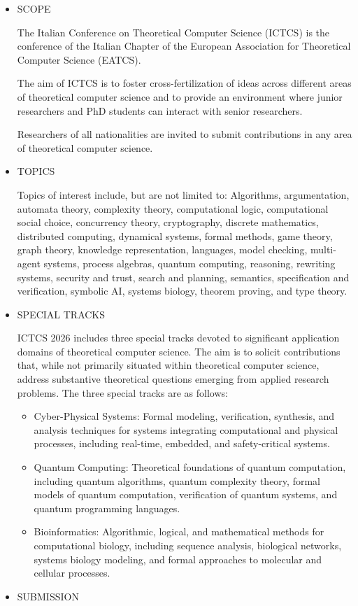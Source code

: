 \documentclass[prodmode,acmtecs]{acmsmall} %
\begin{document}
\begin{itemize}\item  SCOPE 
 
  The Italian Conference on Theoretical Computer Science (ICTCS) is the conference of the Italian Chapter of the European Association for Theoretical Computer Science (EATCS). 
 
  The aim of ICTCS is to foster cross-fertilization of ideas across different areas of theoretical computer science and to provide an environment where junior researchers and PhD students can interact with senior researchers. 
 
  Researchers of all nationalities are invited to submit contributions in any area of theoretical computer science. 
 
\item  TOPICS 
 
  Topics of interest include, but are not limited to: Algorithms, argumentation, automata theory, complexity theory, computational logic, computational social choice, concurrency theory, cryptography, discrete mathematics, distributed computing, dynamical systems, formal methods, game theory, graph theory, knowledge representation, languages, model checking, multi-agent systems, process algebras, quantum computing, reasoning, rewriting systems, security and trust, search and planning, semantics, specification and verification, symbolic AI, systems biology, theorem proving, and type theory. 
 
\item  SPECIAL TRACKS 
 
  ICTCS 2026 includes three special tracks devoted to significant  application domains of theoretical computer science. The aim is to solicit contributions that, while not primarily situated within theoretical computer science, address substantive theoretical questions emerging from applied research problems. The three special tracks are as follows: 
 
\begin{itemize}\item  Cyber-Physical Systems: Formal modeling, verification, synthesis, and analysis techniques for systems integrating computational and physical processes, including real-time, embedded, and safety-critical systems.
\item  Quantum Computing: Theoretical foundations of quantum computation, including quantum algorithms, quantum complexity theory, formal models of quantum computation, verification of quantum systems, and quantum programming languages.
\item  Bioinformatics: Algorithmic, logical, and mathematical methods for computational biology, including sequence analysis, biological networks, systems biology modeling, and formal approaches to molecular and cellular processes.
\end{itemize} 
\item  SUBMISSION 
 

\end{itemize}
\end{document}
